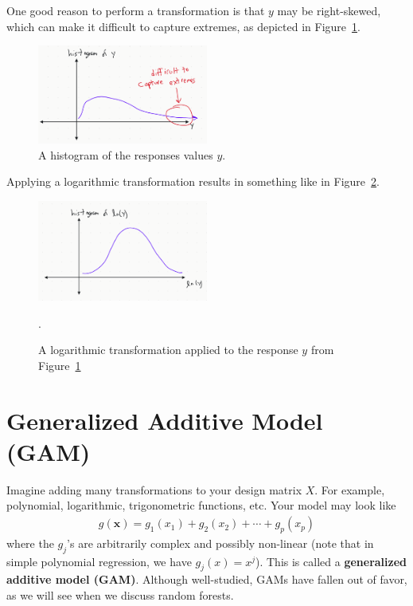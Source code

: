\documentclass[12pt, a4paper]{article}
\theoremstyle{definition}
\begin{document}
	One good reason to perform a transformation is that $y$ may be right-skewed,
	which can make it difficult to capture extremes, as depicted in
	Figure~\ref{fig:histogram-y-difficult-capturing-extremes}.
	\begin{figure}
		\centering
		\includegraphics[width=0.5\textwidth]{histogram-y-capturing-extremes}
		\caption{A histogram of the responses values $y$.}
		\label{fig:histogram-y-difficult-capturing-extremes}
	\end{figure}
	Applying a logarithmic transformation results in something like in
	Figure~\ref{fig:log-transformation-histogram-y}.
	\begin{figure}
		\centering
		\includegraphics[width=0.5\textwidth]{log-transformation-histogram-y}
		\caption{A logarithmic transformation applied to the response $y$
		from Figure~\ref{fig:histogram-y-difficult-capturing-extremes}}.
		\label{fig:log-transformation-histogram-y}
	\end{figure}
	\section*{Generalized Additive Model (GAM)}
	Imagine adding many transformations to your design matrix $X$. For example,
	polynomial, logarithmic, trigonometric functions, etc. Your model may look
	like
	\begin{align*}
		g(\bm{x}) = g_1(x_1) + g_2(x_2) +\cdots+g_p(x_p)
	\end{align*}
	where the $g_j$'s are arbitrarily complex and possibly non-linear (note that
	in simple polynomial regression, we have $g_j(x)=x^j$). This is called a
	\textbf{generalized additive model (GAM)}. Although well-studied, GAMs have
	fallen out of favor, as we will see when we discuss random forests.
	
\end{document}
